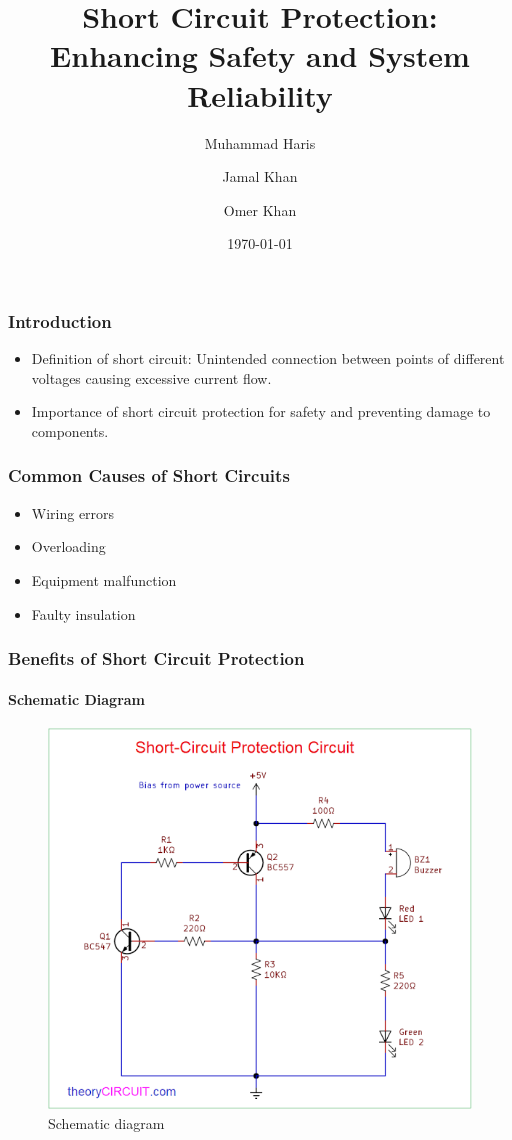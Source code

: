 \documentclass{beamer}
\title{Short Circuit Protection: Enhancing Safety and System Reliability}
\author{Muhammad Haris \and Jamal Khan \and Omer Khan}
\date{\today}
\begin{document}
\begin{frame}
\titlepage
\end{frame}

\begin{frame}
\frametitle{Introduction}
\begin{itemize}
\item Definition of short circuit: Unintended connection between points of different voltages causing excessive current flow.
\item Importance of short circuit protection for safety and preventing damage to components.
\end{itemize}
\end{frame}

\begin{frame}
\frametitle{Common Causes of Short Circuits}
\begin{itemize}
\item Wiring errors
\item Overloading
\item Equipment malfunction
\item Faulty insulation
\end{itemize}
\end{frame}


\begin{frame}
\frametitle{Benefits of Short Circuit Protection}
\framesubtitle{Schematic Diagram}
\begin{figure}
  \centering
  \includegraphics[scale=0.27]{jamal.png}
  \caption{Schematic diagram}
  \label{fig:image1}
\end{figure}
\end{frame}
\end{document}
